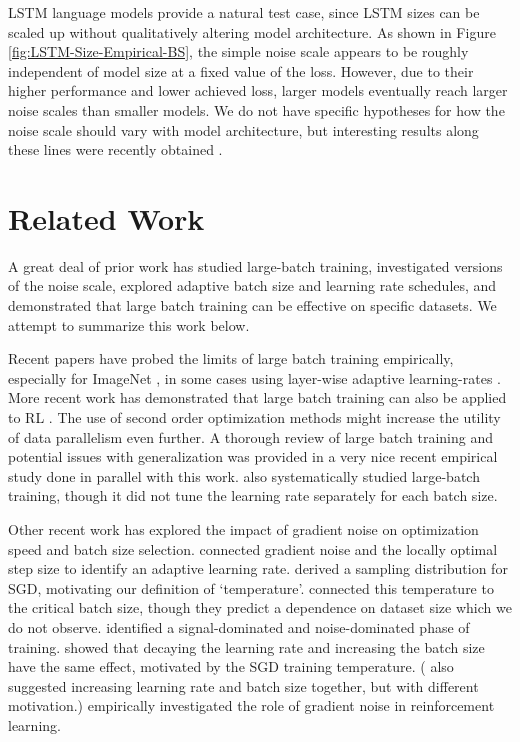 \documentclass[english]{article}
\begin{document}
LSTM language models provide a natural test case, since LSTM sizes can be scaled up without qualitatively altering model architecture. As shown in Figure \ref{fig:LSTM-Size-Empirical-BS}, the simple noise scale appears to be roughly independent of model size at a fixed value of the loss.  However, due to their higher performance and lower achieved loss,  larger models eventually reach larger noise scales than smaller models. We do not have specific hypotheses for how the noise scale should vary with model architecture, but interesting results along these lines were recently obtained \cite{1811.03600}.

\section{Related Work}

\label{sec:RelatedWork}
A great deal of prior work has studied large-batch training, investigated versions of the noise scale, explored adaptive batch size and learning rate schedules, and demonstrated that large batch training can be effective on specific datasets.  We attempt to summarize this work below.

Recent papers have probed the limits of large batch training empirically, especially for ImageNet \cite{1706.02677,1709.05011,1807.11205}, in some cases using layer-wise adaptive learning-rates \cite{1708.03888}. More recent work has demonstrated that large batch training can also be applied to RL \cite{1801.02852,OpenAI_Five,1803.02811,1803.00933}. The use of second order optimization methods \cite{ba2016distributed} might increase the utility of data parallelism even further.
A thorough review of large batch training and potential issues with generalization was provided in a very nice recent empirical study \cite{1811.03600} done in parallel with this work. \cite{1811.12941} also systematically studied large-batch training, though it did not tune the learning rate separately for each batch size.

Other recent work has explored the impact of gradient noise on optimization speed and batch size selection.
\cite{conf/icml/SchaulZL13} connected gradient noise and the locally optimal step size to identify an adaptive learning rate.
\cite{1704.04289} derived a sampling distribution for SGD, motivating our definition of `temperature'.
\cite{1710.06451} connected this temperature to the critical batch size, though they predict a dependence on dataset size which we do not observe.
\cite{1703.00810} identified a signal-dominated and noise-dominated phase of training.
\cite{1711.00489} showed that decaying the learning rate and increasing the batch size have the same effect, motivated by the SGD training temperature.
(\cite{1712.02029} also suggested increasing learning rate and batch size together, but with different motivation.)
\cite{1811.02553} empirically investigated the role of gradient noise in reinforcement learning.
\end{document}
